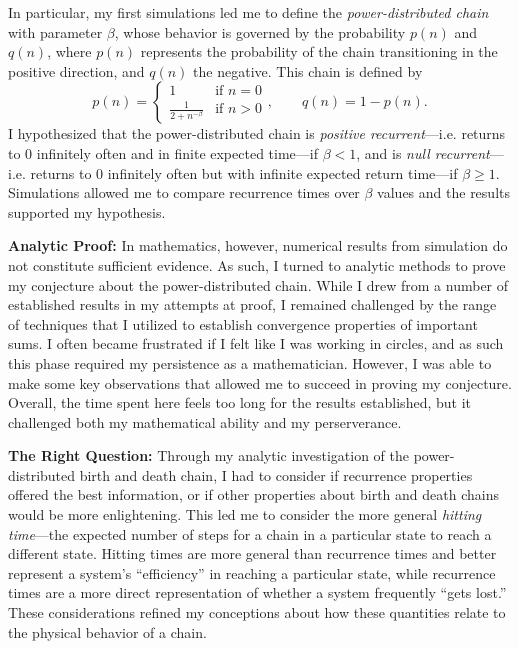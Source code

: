 \documentclass[12pt,letterpaper]{article}
\begin{document}
In particular, my first simulations led me to define the \emph{power-distributed chain} with parameter
$\beta$, whose behavior is governed by the probability $p(n)$ and $q(n)$, where $p(n)$ represents the
probability of the chain transitioning in the positive direction, and $q(n)$ the negative. This chain is
defined by
\[
    p(n) = \begin{cases}
        1 & \text{if } n = 0 \\
        \frac{1}{2+n^{-\beta}} & \text{if } n > 0
    \end{cases}, \quad \quad
    q(n) = 1-p(n).
\]
I hypothesized that the power-distributed chain is \emph{positive recurrent}---i.e. returns to $0$
infinitely often and in finite expected time---if $\beta < 1$, and is \emph{null recurrent}---i.e.
returns to $0$ infinitely often but with infinite expected return time---if $\beta \geq 1$. Simulations
allowed me to compare recurrence times over $\beta$ values and the results supported my hypothesis.

\noindent
\textbf{Analytic Proof:} In mathematics, however, numerical results from simulation do not constitute
sufficient evidence. As such, I turned to analytic methods to prove my conjecture about the
power-distributed chain. While I drew from a number of established results in my attempts at proof, I
remained challenged by the range of techniques that I utilized to establish convergence properties of
important sums. I often became frustrated if I felt like I was working in circles, and as such this
phase required my persistence as a mathematician. However, I was able to make some key observations that
allowed me to succeed in proving my conjecture. Overall, the time spent here feels too long for the
results established, but it challenged both my mathematical ability and my perserverance.

\noindent
\textbf{The Right Question:} Through my analytic investigation of the power-distributed birth and death
chain, I had to consider if recurrence properties offered the best information, or if other properties
about birth and death chains would be more enlightening. This led me to consider the more general
\emph{hitting time}---the expected number of steps for a chain in a particular state to reach a
different state. Hitting times are more general than recurrence times and better represent a system's
``efficiency'' in reaching a particular state, while recurrence times are a more direct representation
of whether a system frequently ``gets lost.'' These considerations refined my conceptions about how
these quantities relate to the physical behavior of a chain.
\end{document}
